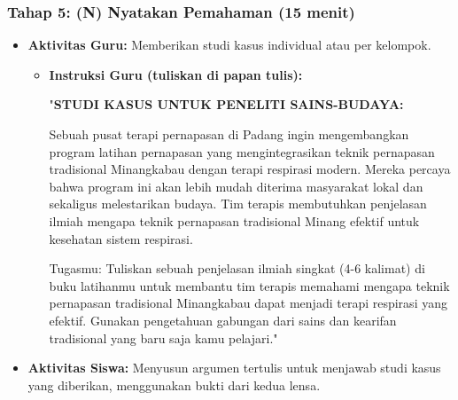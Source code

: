 \documentclass[a4paper,12pt]{article}
\begin{document}
\subsubsection{Tahap 5: (N) Nyatakan Pemahaman (15 menit)}
\begin{itemize}
\item \textbf{Aktivitas Guru:} Memberikan studi kasus individual atau per kelompok.
    \begin{itemize}
    \item \textbf{Instruksi Guru (tuliskan di papan tulis):}
    
    "\textbf{STUDI KASUS UNTUK PENELITI SAINS-BUDAYA:}
    
    Sebuah pusat terapi pernapasan di Padang ingin mengembangkan program latihan pernapasan yang mengintegrasikan teknik pernapasan tradisional Minangkabau dengan terapi respirasi modern. Mereka percaya bahwa program ini akan lebih mudah diterima masyarakat lokal dan sekaligus melestarikan budaya. Tim terapis membutuhkan penjelasan ilmiah mengapa teknik pernapasan tradisional Minang efektif untuk kesehatan sistem respirasi.
    
    Tugasmu: Tuliskan sebuah penjelasan ilmiah singkat (4-6 kalimat) di buku latihanmu untuk membantu tim terapis memahami mengapa teknik pernapasan tradisional Minangkabau dapat menjadi terapi respirasi yang efektif. Gunakan pengetahuan gabungan dari sains dan kearifan tradisional yang baru saja kamu pelajari."
    \end{itemize}
\item \textbf{Aktivitas Siswa:} Menyusun argumen tertulis untuk menjawab studi kasus yang diberikan, menggunakan bukti dari kedua lensa.
\end{itemize}
\end{document}
